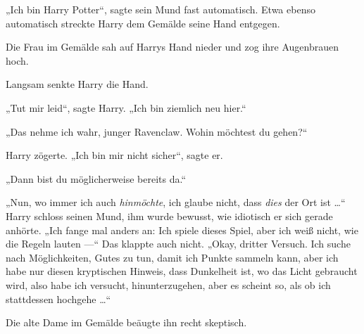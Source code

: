 „Ich bin Harry Potter“, sagte sein Mund fast automatisch. Etwa ebenso automatisch streckte Harry dem Gemälde seine Hand entgegen.

Die Frau im Gemälde sah auf Harrys Hand nieder und zog ihre Augenbrauen hoch.

Langsam senkte Harry die Hand.

„Tut mir leid“, sagte Harry.
„Ich bin ziemlich neu hier.“

„Das nehme ich wahr, junger Ravenclaw. Wohin möchtest du gehen?“

Harry zögerte.
„Ich bin mir nicht sicher“, sagte er.

„Dann bist du möglicherweise bereits da.“

„Nun, wo immer ich auch \emph{hinmöchte}, ich glaube nicht, dass \emph{dies} der Ort ist …“ Harry schloss seinen Mund, ihm wurde bewusst, wie idiotisch er sich gerade anhörte.
„Ich fange mal anders an: Ich spiele dieses Spiel, aber ich weiß nicht, wie die Regeln lauten —“ Das klappte auch nicht.
„Okay, dritter Versuch. Ich suche nach Möglichkeiten, Gutes zu tun, damit ich Punkte sammeln kann, aber ich habe nur diesen kryptischen Hinweis, dass Dunkelheit ist, wo das Licht gebraucht wird, also habe ich versucht, hinunterzugehen, aber es scheint so, als ob ich stattdessen hochgehe …“ %

Die alte Dame im Gemälde beäugte ihn recht skeptisch.

